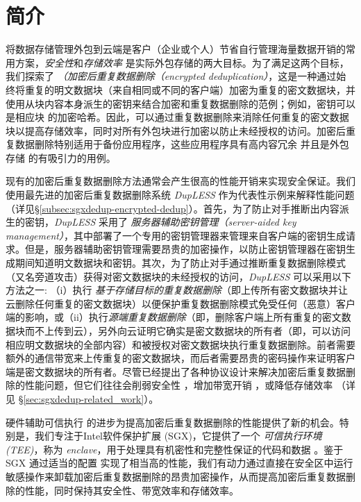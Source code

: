 \section{简介}
\label{sec:sgxdedup-introduction}

将数据存储管理外包到云端是客户（企业或个人）节省自行管理海量数据开销的常用方案，\textit{安全性}和\textit{存储效率} 是实际外包存储的两大目标。为了满足这两个目标，我们探索了 \textit{（加密后重复数据删除（encrypted deduplication）}，这是一种通过始终将重复的明文数据块（来自相同或不同的客户端）加密为重复的密文数据块，并使用从块内容本身派生的密钥来结合加密和重复数据删除的范例；例如，密钥可以是相应块 \cite{douceur02} 的加密哈希。因此，可以通过重复数据删除来消除任何重复的密文数据块以提高存储效率，同时对所有外包块进行加密以防止未经授权的访问。加密后重复数据删除特别适用于备份应用程序，这些应用程序具有高内容冗余 \cite{wallace12} 并且是外包存储 \cite{hasan05,kotla07,varble09} 的有吸引力的用例。
  
现有的加密后重复数据删除方法通常会产生很高的性能开销来实现安全保证。我们使用最先进的加密后重复数据删除系统 {\em DupLESS} \cite{bellare2013DupLESS} 作为代表性示例来解释性能问题（详见\S\ref{subsec:sgxdedup-encrypted-dedup}）。首先，为了防止对手推断出内容派生的密钥，{\em DupLESS} 采用了 \textit{服务器辅助密钥管理（server-aided key management）}，其中部署了一个专用的密钥管理器来管理来自客户端的密钥生成请求。但是，服务器辅助密钥管理需要昂贵的加密操作，以防止密钥管理器在密钥生成期间知道明文数据块和密钥。其次，为了防止对手通过推断重复数据删除模式（又名旁道攻击\cite{harnik2010side, halevi2011proofs}）获得对密文数据块的未经授权的访问，{\em DupLESS} 可以采用以下方法之一: （i）执行 \textit{基于存储目标的重复数据删除}（即上传所有密文数据块并让云删除任何重复的密文数据块）以便保护重复数据删除模式免受任何（恶意）客户端的影响，或（ii）执行\textit{源端重复数据删除}（即，删除客户端上所有重复的密文数据块而不上传到云），另外向云证明它确实是密文数据块的所有者（即，可以访问相应明文数据块的全部内容）和被授权对密文数据块执行重复数据删除。前者需要额外的通信带宽来上传重复的密文数据块，而后者需要昂贵的密码操作来证明客户端是密文数据块的所有者。尽管已经提出了各种协议设计来解决加密后重复数据删除的性能问题，但它们往往会削弱安全性 \cite{li20b,xu2013weak,pietro12}，增加带宽开销 \cite{harnik10,li15}，或降低存储效率 \cite{zhou2015secdep, qin17,li20b}（详见 \S\ref{sec:sgxdedup-related_work}）。
  
硬件辅助可信执行 \cite{trustzone,sgx,Mktem,AMDSEV} 的进步为提高加密后重复数据删除的性能提供了新的机会。特别是，我们专注于Intel软件保护扩展 (SGX)，它提供了一个 \textit{ 可信执行环境 (TEE)}，称为 \textit{ enclave}，用于处理具有机密性和完整性保证的代码和数据 \cite{baumann2014Shielding }。鉴于 SGX 通过适当的配置 \cite{harnik18} 实现了相当高的性能，我们有动力通过直接在安全区中运行敏感操作来卸载加密后重复数据删除的昂贵加密操作，从而提高加密后重复数据删除的性能，同时保持其安全性、带宽效率和存储效率。

